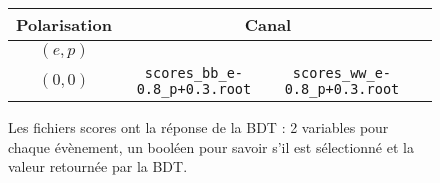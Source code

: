 

\begin{figure}[!ht]
	\centering
	\begin{tabular}{ | c | c | c | c | }
		\hline
		Polarisation & \multicolumn{2}{c|}{Canal} \\
		\hline
		$(e,p)$ & \bb &  \WW \\
		\hline \cline{2-3}
		$(0,0)$ & \verb|scores_bb_e-0.8_p+0.3.root| & \verb|scores_ww_e-0.8_p+0.3.root| \\
		\hline
	\end{tabular}
	\label{files:scores}
	\caption{Les fichiers scores ont la réponse de la BDT : 2 variables pour chaque évènement, un booléen pour savoir s'il est sélectionné et la valeur retournée par la BDT.}
\end{figure}